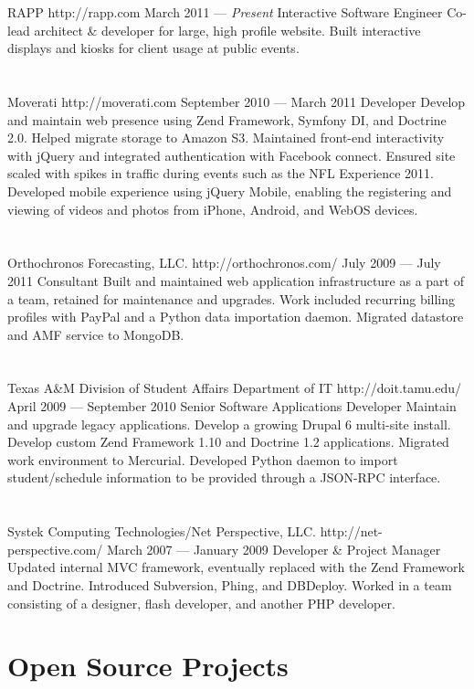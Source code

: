 \documentclass{resume}
\begin{document}
\employer
	{RAPP}
	{http://rapp.com}
	{March 2011 --- \emph{Present}}
	{Interactive Software Engineer}
	{Co-lead architect \& developer for large, high profile website. Built interactive displays and kiosks for client usage at public events.}
\\ \\ \\
\employer
	{Moverati}
	{http://moverati.com}
	{September 2010 --- March 2011}
	{Developer}
	{Develop and maintain web presence using Zend Framework, Symfony DI, and Doctrine 2.0. Helped migrate storage to Amazon S3. Maintained front-end interactivity with jQuery and integrated authentication with Facebook connect. Ensured site scaled with spikes in traffic during events such as the NFL Experience 2011. Developed mobile experience using jQuery Mobile, enabling the registering and viewing of videos and photos from iPhone, Android, and WebOS devices.}
\\ \\ \\
\employer
	{Orthochronos Forecasting, LLC.}
	{http://orthochronos.com/}
	{July 2009 --- July 2011}
	{Consultant}
	{Built and maintained web application infrastructure as a part of a team, retained for maintenance and upgrades. Work included recurring billing profiles with PayPal and a Python data importation daemon. Migrated datastore and AMF service to MongoDB.}
\\ \\ \\
\employer
	{Texas A\&M Division of Student Affairs Department of IT}
	{http://doit.tamu.edu/}
	{April 2009 --- September 2010}
	{Senior Software Applications Developer}
	{Maintain and upgrade legacy applications. Develop a growing Drupal 6 multi-site install. Develop custom Zend Framework 1.10 and Doctrine 1.2 applications. Migrated work environment to Mercurial. Developed Python daemon to import student/schedule information to be provided through a JSON-RPC interface.}
\\ \\ \\
\employer
	{Systek Computing Technologies/Net Perspective, LLC.}
	{http://net-perspective.com/}
	{March 2007 --- January 2009}
	{Developer \& Project Manager}
	{Updated internal MVC framework, eventually replaced with the Zend Framework and Doctrine. Introduced Subversion, Phing, and DBDeploy. Worked in a team consisting of a designer, flash developer, and another PHP developer.}

\section{Open Source Projects}
\end{document}
